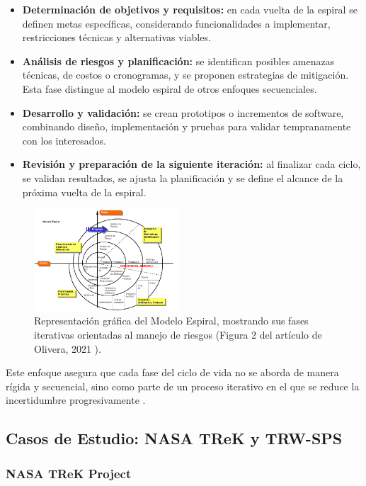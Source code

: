 \documentclass[conference]{IEEEtran}
\begin{document}
\begin{itemize}
    \item \textbf{Determinación de objetivos y requisitos:} en cada vuelta de la espiral se definen metas específicas, considerando funcionalidades a implementar, restricciones técnicas y alternativas viables.
    \item \textbf{Análisis de riesgos y planificación:} se identifican posibles amenazas técnicas, de costos o cronogramas, y se proponen estrategias de mitigación. Esta fase distingue al modelo espiral de otros enfoques secuenciales.
    \item \textbf{Desarrollo y validación:} se crean prototipos o incrementos de software, combinando diseño, implementación y pruebas para validar tempranamente con los interesados.
    \item \textbf{Revisión y preparación de la siguiente iteración:} al finalizar cada ciclo, se validan resultados, se ajusta la planificación y se define el alcance de la próxima vuelta de la espiral.
\end{itemize}

\begin{figure}[h]
    \centering
    \includegraphics[width=0.48\textwidth]{espiral.png}
    \caption{Representación gráfica del Modelo Espiral, mostrando sus fases iterativas orientadas al manejo de riesgos (Figura 2 del artículo de Olivera, 2021 \cite{olivera2021redalyc}).}
    \label{fig:espiral}
\end{figure}

Este enfoque asegura que cada fase del ciclo de vida no se aborda de manera rígida y secuencial, sino como parte de un proceso iterativo en el que se reduce la incertidumbre progresivamente \cite{boehm1988spiral}.

\subsection{Casos de Estudio: NASA TReK y TRW-SPS}

\subsubsection{NASA TReK Project}
\end{document}
